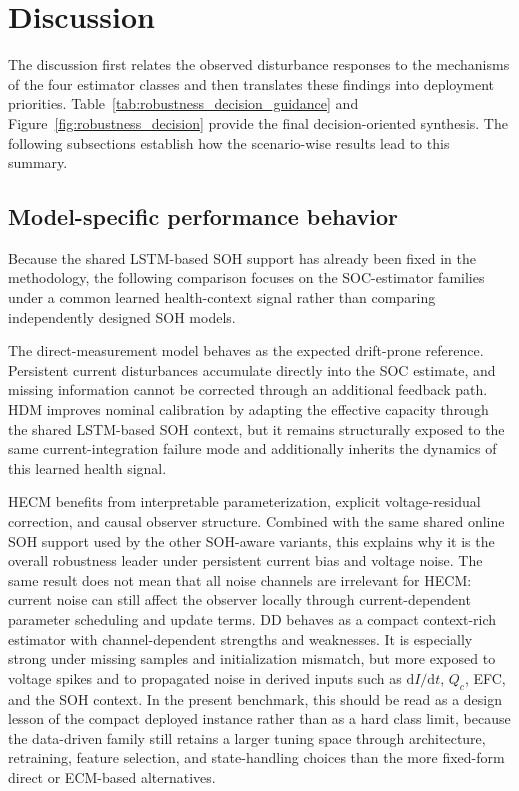 \documentclass[
    a4paper,
    12pt,
    titlepage,
    bibliography=totoc,
    twoside=on,
    parskip=false,
    numbers=noenddot,
    cleardoublepage=empty,
    DIV=12,
    BCOR=12.0mm,
    headheight=36pt,
    headings=openright
]{scrreprt}
\begin{document}
\section{Discussion}
The discussion first relates the observed disturbance responses to the mechanisms of the four estimator classes and then translates these findings into deployment priorities. Table~\ref{tab:robustness_decision_guidance} and Figure~\ref{fig:robustness_decision} provide the final decision-oriented synthesis. The following subsections establish how the scenario-wise results lead to this summary.

\subsection{Model-specific performance behavior}
Because the shared LSTM-based SOH support has already been fixed in the methodology, the following comparison focuses on the SOC-estimator families under a common learned health-context signal rather than comparing independently designed SOH models.

The direct-measurement model behaves as the expected drift-prone reference. Persistent current disturbances accumulate directly into the SOC estimate, and missing information cannot be corrected through an additional feedback path. HDM improves nominal calibration by adapting the effective capacity through the shared LSTM-based SOH context, but it remains structurally exposed to the same current-integration failure mode and additionally inherits the dynamics of this learned health signal.

HECM benefits from interpretable parameterization, explicit voltage-residual correction, and causal observer structure. Combined with the same shared online SOH support used by the other SOH-aware variants, this explains why it is the overall robustness leader under persistent current bias and voltage noise. The same result does not mean that all noise channels are irrelevant for HECM: current noise can still affect the observer locally through current-dependent parameter scheduling and update terms. DD behaves as a compact context-rich estimator with channel-dependent strengths and weaknesses. It is especially strong under missing samples and initialization mismatch, but more exposed to voltage spikes and to propagated noise in derived inputs such as $\mathrm{d}I/\mathrm{d}t$, $Q_c$, EFC, and the SOH context. In the present benchmark, this should be read as a design lesson of the compact deployed instance rather than as a hard class limit, because the data-driven family still retains a larger tuning space through architecture, retraining, feature selection, and state-handling choices than the more fixed-form direct or ECM-based alternatives.
\end{document}
